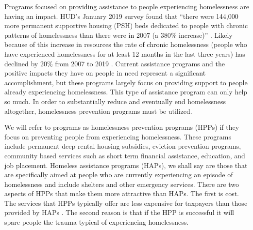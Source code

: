 \documentclass[utf8]{frontiersFPHY} %
\begin{document}
Programs focused on providing assistance to people experiencing homelessness are having an impact. HUD's January 2019 survey found that ``there were 144,000 more permanent supportive housing (PSH) beds dedicated to people with chronic patterns of homelessness than there were in 2007 (a 380\% increase)'' \cite{2019AHAR}. Likely because of this increase in resources the rate of chronic homelessness (people who have experienced homelessness for at least 12 months in the last three years) has declined by 20\% from 2007 to 2019 \cite{2019AHAR}. Current assistance programs and the positive impacts they have on people in need represent a significant accomplishment, but these programs largely focus on providing support to people already experiencing homelessness. This type of assistance program can only help so much. In order to substantially reduce and eventually end homelessness altogether, homelessness prevention programs must be utilized. 

We will refer to programs as homelessness prevention programs (HPPs) if they focus on preventing people from experiencing homelessness. These programs include permanent deep rental housing subsidies, eviction prevention programs, community based services such as short term financial assistance, education, and job placement. Homeless assistance programs (HAPs), we shall say are those that are specifically aimed at people who are currently experiencing an episode of homelessness and include shelters and other emergency services. There are two aspects of HPPs that make them more attractive than HAPs. The first is cost. The services that HPPs typically offer are less expensive for taxpayers than those provided by HAPs \cite{shinn2019homelessness}. The second reason is that if the HPP is successful it will spare people the trauma typical of experiencing homelessness.
\end{document}
